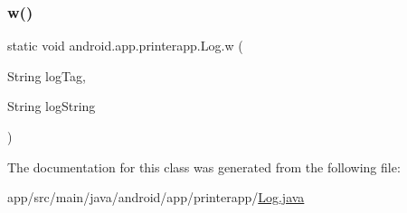\mbox{\label{classandroid_1_1app_1_1printerapp_1_1_log_a53da8be931dc909129a9bc7d530ae0ed}} 
\subsubsection{\texorpdfstring{w()}{w()}}
{\footnotesize\ttfamily static void android.\+app.\+printerapp.\+Log.\+w (\begin{DoxyParamCaption}\item[{String}]{log\+Tag,  }\item[{String}]{log\+String }\end{DoxyParamCaption})\hspace{0.3cm}{\ttfamily [static]}}



The documentation for this class was generated from the following file\+:\begin{DoxyCompactItemize}
\item 
app/src/main/java/android/app/printerapp/\hyperlink{_log_8java}{Log.\+java}\end{DoxyCompactItemize}
